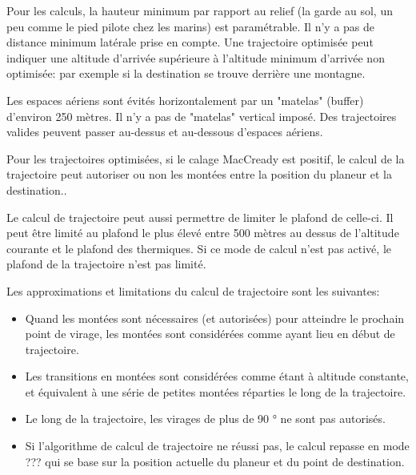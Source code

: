 Pour les calculs, la hauteur minimum par rapport au relief (la garde au sol, un peu comme le pied pilote chez les marins) est paramétrable.  Il n'y a pas de distance minimum latérale prise en compte.
Une trajectoire optimisée peut indiquer une altitude d'arrivée supérieure à l'altitude minimum d'arrivée non optimisée: par exemple si la destination se trouve derrière une montagne.

Les espaces aériens sont évités horizontalement par un "matelas" (buffer) d'environ 250 mètres. Il n'y a pas de "matelas" vertical imposé. Des trajectoires valides peuvent passer au-dessus et au-dessous d'espaces aériens.

Pour les trajectoires optimisées, si le calage MacCready est positif, le calcul de la trajectoire peut autoriser ou non les montées entre la position du planeur et la destination..

Le calcul de trajectoire peut aussi permettre de limiter le plafond de celle-ci. Il peut être limité au plafond le plus élevé entre 500 mètres au dessus de l'altitude courante et le plafond des thermiques. Si ce mode de calcul n'est pas activé, le plafond de la trajectoire n'est pas limité.


Les approximations et limitations du calcul de trajectoire sont les suivantes:
\begin{itemize}
\item Quand les montées sont nécessaires (et autorisées) pour atteindre le prochain point de virage, les montées sont considérées comme ayant lieu en début de trajectoire.
\item Les transitions en montées sont considérées comme étant à altitude constante, et équivalent à une série de petites montées réparties le long de la trajectoire.
\item Le long de la trajectoire, les virages de plus de 90 ° ne sont pas autorisés.
\item Si l'algorithme de calcul de trajectoire ne réussi pas, le calcul repasse en mode ??? qui se base sur la position actuelle du planeur et du point de destination.
\end{itemize}

